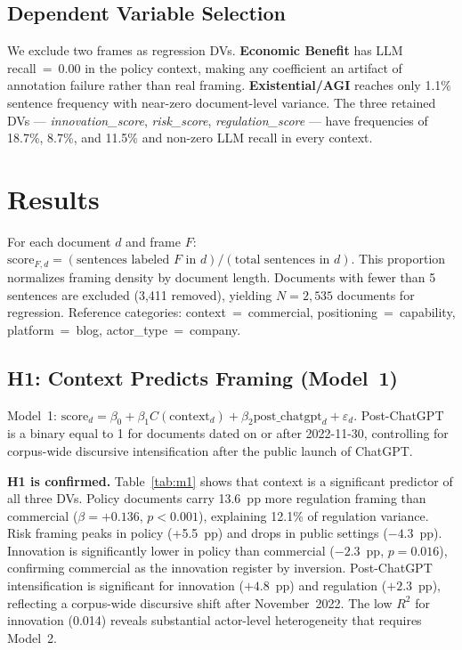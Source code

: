 \documentclass[11pt,a4paper,twocolumn]{article}
\begin{document}
\subsection{Dependent Variable Selection}

We exclude two frames as regression DVs. \textbf{Economic Benefit} has LLM
recall~=~0.00 in the policy context, making any coefficient an artifact of
annotation failure rather than real framing. \textbf{Existential/AGI} reaches
only 1.1\% sentence frequency with near-zero document-level variance. The three
retained DVs — \textit{innovation\_score}, \textit{risk\_score},
\textit{regulation\_score} — have frequencies of 18.7\%, 8.7\%, and 11.5\%
and non-zero LLM recall in every context.


\section{Results}

For each document $d$ and frame $F$:
$\text{score}_{F,d} = (\text{sentences labeled } F \text{ in } d) /
(\text{total sentences in } d)$.
This proportion normalizes framing density by document length. Documents with
fewer than 5 sentences are excluded (3,411 removed), yielding $N = 2{,}535$
documents for regression. Reference categories: context~=~commercial,
positioning~=~capability, platform~=~blog, actor\_type~=~company.

\subsection{H1: Context Predicts Framing (Model~1)}

Model~1: $\text{score}_{d} = \beta_0 + \beta_1 C(\text{context}_d) + \beta_2 \text{post\_chatgpt}_d + \varepsilon_d$.
Post-ChatGPT is a binary equal to 1 for documents dated on or after 2022-11-30,
controlling for corpus-wide discursive intensification after the public launch of ChatGPT.

\textbf{H1 is confirmed.} Table~\ref{tab:m1} shows that context is a significant
predictor of all three DVs. Policy documents carry 13.6~pp more regulation
framing than commercial ($\beta = +0.136$, $p < 0.001$), explaining 12.1\% of
regulation variance. Risk framing peaks in policy (+5.5~pp) and drops in public
settings ($-4.3$~pp). Innovation is significantly lower in policy than
commercial ($-2.3$~pp, $p = 0.016$), confirming commercial as the innovation
register by inversion. Post-ChatGPT intensification is significant for
innovation ($+4.8$~pp) and regulation ($+2.3$~pp), reflecting a corpus-wide
discursive shift after November~2022. The low $R^2$ for innovation (0.014)
reveals substantial actor-level heterogeneity that requires Model~2.
\end{document}
